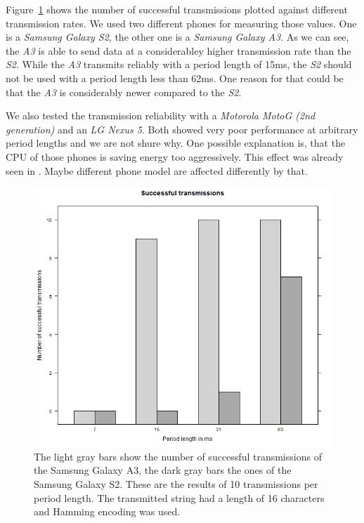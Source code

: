 \documentclass{sig-alternate} %
\begin{document}
Figure~\ref{fig:successful_transmissions} shows the number of successful transmissions plotted against different transmission rates.
We used two different phones for measuring those values.
One is a \textit{Samsung Galaxy S2}, the other one is a \textit{Samsung Galaxy A3}.
As we can see, the \textit{A3} is able to send data at a considerabley higher transmission rate than the \textit{S2}.
While the \textit{A3} transmits reliably with a period length of 15ms, the \textit{S2} should not be used with a period length less than 62ms.
One reason for that could be that the \textit{A3} is considerably newer compared to the \textit{S2}.

We also tested the transmission reliability with a \textit{Motorola MotoG (2nd generation)} and an \textit{LG Nexus 5}.
Both showed very poor performance at arbitrary period lengths and we are not shure why.
One possible explanation is, that the CPU of those phones is saving energy too aggressively.
This effect was already seen in \cite{mongia2010reliable}.
Maybe different phone model are affected differently by that.

\begin{figure}
	\centering
	\includegraphics[scale=.35]{images/successful-transmissions.png}
	\caption{The light gray bars show the number of successful transmissions of the Samsung Galaxy A3, the dark gray bars the ones of the Samsung Galaxy S2. These are the results of 10 transmissions per period length. The transmitted string had a length of 16 characters and Hamming encoding was used.}
	\label{fig:successful_transmissions}
\end{figure}
\end{document}
